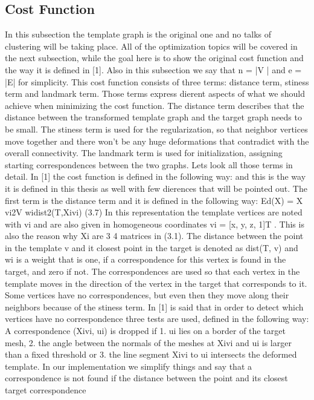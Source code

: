 \documentclass[../structure.tex]{subfiles}
\begin{document}
\subsection{Cost Function}
In this subsection the template graph is the original one and no talks of
clustering will be taking place. All of the optimization topics will be covered
in the next subsection, while the goal here is to show the original cost function
and the way it is defined in [1]. Also in this subsection we say that n = |V | and e = |E| for simplicity.
This cost function consists of three terms: distance term, stiness term
and landmark term. Those terms express dierent aspects of what we should
achieve when minimizing the cost function. The distance term describes that
the distance between the transformed template graph and the target graph
needs to be small. The stiness term is used for the regularization, so that
neighbor vertices move together and there won’t be any huge deformations
that contradict with the overall connectivity. The landmark term is used for
initialization, assigning starting correspondences between the two graphs.
Lets look all those terms in detail.
In [1] the cost function is defined in the following way:
and this is the way it is defined in this thesis as well with few dierences that
will be pointed out. The first term is the distance term and it is defined in
the following way:
Ed(X) =
X
vi2V
widist2(T,Xivi) (3.7)
In this representation the template vertices are noted with vi and are also
given in homogeneous coordinates vi = [x, y, z, 1]T . This is also the reason
why Xi are 3 4 matrices in (3.1).
The distance between the point in the template v and it closest point
in the target is denoted as dist(T, v) and wi is a weight that is one, if a
correspondence for this vertex is found in the target, and zero if not. The
correspondences are used so that each vertex in the template moves in the
direction of the vertex in the target that corresponds to it. Some vertices
have no correspondences, but even then they move along their neighbors
because of the stiness term. In [1] is said that in order to detect which
vertices have no correspondence three tests are used, defined in the following
way: A correspondence (Xivi, ui) is dropped if
1. ui lies on a border of the target mesh,
2. the angle between the normals of the meshes at Xivi and ui is larger
than a fixed threshold or
3. the line segment Xivi to ui intersects the deformed template.
In our implementation we simplify things and say that a correspondence
is not found if the distance between the point and its closest target correspondence
\end{document}

